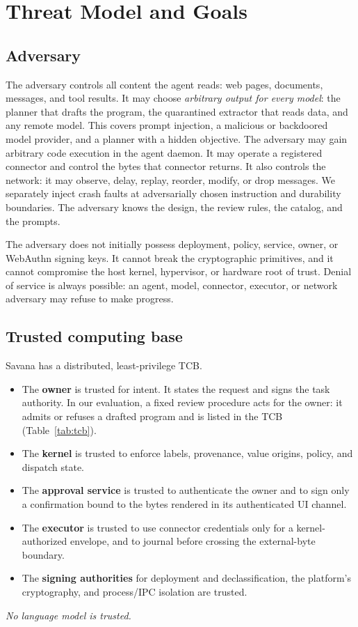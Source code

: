 \documentclass[letterpaper,twocolumn,10pt]{article}
\newcommand{\sys}{Savana}
\begin{document}
\section{Threat Model and Goals}
\label{sec:threat}

\subsection{Adversary}

The adversary controls all content the agent reads: web pages, documents,
messages, and tool results. It may choose \emph{arbitrary output for every
model}: the planner that drafts the program, the quarantined extractor that
reads data, and any remote model. This covers prompt injection, a
malicious or backdoored model provider, and a planner with a hidden
objective. The adversary may gain arbitrary code execution in the agent
daemon. It may operate a registered connector and control the bytes that
connector returns. It also controls the network: it may observe, delay,
replay, reorder, modify, or drop messages. We separately inject crash
faults at adversarially chosen instruction and durability boundaries. The
adversary knows the design, the review rules, the catalog, and the prompts.

The adversary does not initially possess deployment, policy, service, owner,
or WebAuthn signing keys. It cannot break the cryptographic primitives, and
it cannot compromise the host kernel, hypervisor, or hardware root of trust.
Denial of service is always possible: an agent, model, connector, executor,
or network adversary may refuse to make progress.

\subsection{Trusted computing base}

\sys{} has a distributed, least-privilege TCB.
\begin{itemize}
\item The \textbf{owner} is trusted for intent. It states the request and
  signs the task authority. In our evaluation, a fixed review procedure acts
  for the owner: it admits or refuses a drafted program and is listed in the
  TCB (Table~\ref{tab:tcb}).
\item The \textbf{kernel} is trusted to enforce labels, provenance, value
  origins, policy, and dispatch state.
\item The \textbf{approval service} is trusted to authenticate the owner and
  to sign only a confirmation bound to the bytes rendered in its
  authenticated UI channel.
\item The \textbf{executor} is trusted to use connector credentials only for
  a kernel-authorized envelope, and to journal before crossing the
  external-byte boundary.
\item The \textbf{signing authorities} for deployment and declassification,
  the platform's cryptography, and process/IPC isolation are trusted.
\end{itemize}
\emph{No language model is trusted.}
\end{document}
